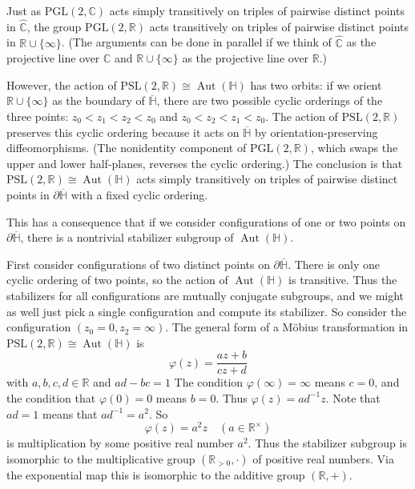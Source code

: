 \documentclass[12pt]{article}
\theoremstyle{definition}
\theoremstyle{remark}
\newcommand{\R}{\mathbb{R}}
\newcommand{\C}{\mathbb{C}}
\DeclareMathOperator{\Aut}{Aut}
\renewcommand{\phi}{\varphi}
\newcommand{\hC}{\widehat{\mathbb{C}}}
\newcommand{\bH}{\mathbb{H}}
\newcommand{\PGL}{\mathrm{PGL}}
\newcommand{\PSL}{\mathrm{PSL}}
\begin{document}
Just as $\PGL(2,\C)$ acts simply transitively on triples of pairwise distinct points in $\hC$, the group $\PGL(2,\R)$ acts transitively on triples of pairwise distinct points in $\R \cup \{\infty\}$. (The arguments can be done in parallel if we think of $\hC$ as the projective line over $\C$ and $\R\cup\{\infty\}$ as the projective line over $\R$.)

However, the action of $\PSL(2,\R) \cong \Aut(\bH)$ has two orbits: if we orient $\R \cup \{\infty\}$ as the boundary of $\overline{\bH}$, there are two possible cyclic orderings of the three points: $z_{0} < z_{1} < z_{2} < z_{0}$ and $z_{0} < z_{2} < z_{1} < z_{0}$. The action of $\PSL(2,\R)$ preserves this cyclic ordering because it acts on $\overline{\bH}$ by orientation-preserving diffeomorphisms. (The nonidentity component of $\PGL(2,\R)$, which swaps the upper and lower half-planes, reverses the cyclic ordering.) The conclusion is that $\PSL(2,\R) \cong \Aut(\bH)$ acts simply transitively on triples of pairwise distinct points in $\partial \overline{\bH}$ with a fixed cyclic ordering.

This has a consequence that if we consider configurations of one or two points on $\partial \overline{\bH}$, there is a nontrivial stabilizer subgroup of $\Aut(\bH)$.

First consider configurations of two distinct points on $\partial \overline{\bH}$. There is only one cyclic ordering of two points, so the action of $\Aut(\bH)$ is transitive. Thus the stabilizers for all configurations are mutually conjugate subgroups, and we might as well just pick a single configuration and compute its stabilizer. So consider the configuration $(z_{0} = 0, z_{2} = \infty)$. The general form of a M\"{o}bius transformation in $\PSL(2,\R) \cong \Aut(\bH)$ is
\begin{equation*}
  \phi(z) = \frac{az + b}{cz+d}
\end{equation*}
with $a,b,c,d \in \R$ and $ad-bc = 1$
The condition $\phi(\infty) = \infty$ means $c = 0$, and the condition that $\phi(0) = 0$ means $b = 0$. Thus $\phi(z) = ad^{-1} z$. Note that $ad = 1$ means that $ad^{-1} = a^{2}$. So
\begin{equation*}
  \phi(z) = a^{2}z \quad (a \in \R^{\times})
\end{equation*}
 is multiplication by some positive real number $a^{2}$. Thus the stabilizer subgroup is isomorphic to the multiplicative group $(\R_{>0},\cdot)$ of positive real numbers. Via the exponential map this is isomorphic to the additive group $(\R,+)$.
\end{document}

